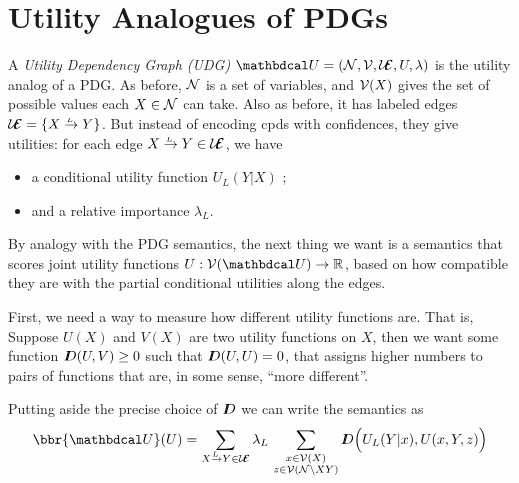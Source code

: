 \documentclass{article}
\newcommand\UEd{\mathcal U\!\!\Ed}
\begin{document}
    
        
    \onecolumn
    \section{Utility Analogues of PDGs}
    
    \begin{defn}
        A \emph{Utility Dependency Graph (UDG)}  $\dg U = (\N, \V, \UEd, U, \lambda)$ is the utility analog of a PDG.  As before, $\mathcal N$ is a set of variables, and $\mathcal V(X)$ gives the set of possible values each $X \in \mathcal N$ can take. 
        Also as before, it has labeled edges $\UEd = \{ \ed {L}XY \} $. But instead of encoding cpds with confidences, they give utilities: for each edge $\ed LXY \in \UEd$, we have 
        \begin{itemize}
            \item  a conditional utility function $U_L(Y|X)$%
            ;
            \item and a relative importance $\lambda_L$.  \qedhere
        \end{itemize}
    \end{defn}

    By analogy with the PDG semantics, the next thing we want is a semantics that scores joint utility functions $U : \V(\dg U) \to \mathbb R$, based on how compatible they are with the partial conditional utilities along the edges. 
    
    First, we need a way to measure how different utility functions are. That is,  Suppose $U(X)$ and $V(X)$ are two utility functions on $X$, then we want some function $I\mkern-8muD(U,V) \ge 0$ such that $I\mkern-8muD(U,U) = 0$, that assigns higher numbers to pairs of functions that are, in some sense, ``more different''.
    
    Putting aside the precise choice of $I\mkern-8muD$ we can write the semantics as 
    \begin{equation}
        \bbr{\dg U}(U) =
             \sum_{\ed LXY \in \UEd} \lambda_L\, \sum_{\substack{x \in \V(X)\\z \in \V(\N\setminus XY)}}
             \thickD\Big( U_L(Y | x),  U(x,Y,z) \Big)
    \end{equation}
\end{document}
